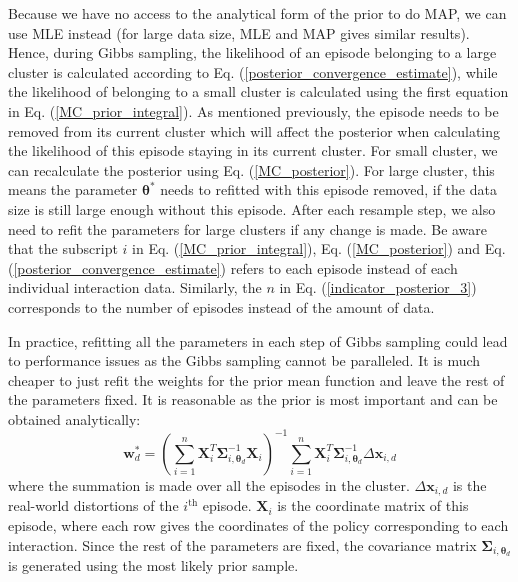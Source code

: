 Because we have no access to the analytical form of the prior to do MAP, we can use MLE instead (for large data size, MLE and MAP gives similar results).
Hence, during Gibbs sampling, the likelihood of an episode belonging to a large cluster is calculated according to Eq. (\ref{posterior_convergence_estimate}), while the likelihood of belonging to a small cluster is calculated using the first equation in Eq. (\ref{MC_prior_integral}).
As mentioned previously, the episode needs to be removed from its current cluster which will affect the posterior when calculating the likelihood of this episode staying in its current cluster.
For small cluster, we can recalculate the posterior using Eq. (\ref{MC_posterior}).
For large cluster, this means the parameter $\bm{\theta}^*$ needs to refitted with this episode removed, if the data size is still large enough without this episode. 
After each resample step, we also need to refit the parameters for large clusters if any change is made.
Be aware that the subscript $i$ in Eq. (\ref{MC_prior_integral}), Eq. (\ref{MC_posterior}) and Eq. (\ref{posterior_convergence_estimate}) refers to each episode instead of each individual interaction data. 
Similarly, the $n$ in Eq. (\ref{indicator_posterior_3}) corresponds to the number of episodes instead of the amount of data.


In practice, refitting all the parameters in each step of Gibbs sampling could lead to performance issues as the Gibbs sampling cannot be paralleled.
It is much cheaper to just refit the weights for the prior mean function and leave the rest of the parameters fixed.
It is reasonable as the prior is most important and can be obtained analytically:
\begin{equation}
\bm{w}_d^* = \left(\sum_{i=1}^n
\bm{X}_i^T \bm{\Sigma}_{i, \bm{\theta}_d}^{-1} \bm{X}_i
\right)^{-1} \sum_{i=1}^n \bm{X}^T_i \bm{\Sigma}_{i, \bm{\theta}_d}^{-1} \Delta \bm{x}_{i, d}
\label{refitted_weights}
\end{equation}
where the summation is made over all the episodes in the cluster.
$\Delta \bm{x}_{i, d}$ is the real-world distortions of the $i^{\text{th}}$ episode.
$\bm{X}_i$ is the coordinate matrix of this episode, where each row gives the coordinates of the policy corresponding to each interaction.
Since the rest of the parameters are fixed, the covariance matrix $\bm{\Sigma}_{i, \bm{\theta}_d}$ is generated using the most likely prior sample.



